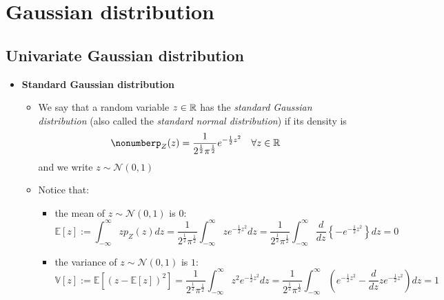 \documentclass[12pt,a4paper]{article}
\begin{document}
\section{Gaussian distribution}

\subsection{Univariate Gaussian distribution}

\begin{itemize}

\item \textbf{Standard Gaussian distribution}

  \begin{itemize}

  \item We say that a random variable $z\in \mathbb{R}$ has
    the \emph{standard Gaussian distribution} (also called the \emph{standard normal distribution}) if
    its density is
    \begin{equation}\nonumber%
      p_{Z}(z)
      = \frac{1}{2^{\frac{1}{2}}\pi^{\frac{1}{2}}}e^{- \frac{1}{2}z^{2}}
      \quad \forall z\in \R
    \end{equation}
    and we write $z\sim \mathcal{N}(0,1)$

  \item Notice that:
    \begin{itemize}
    \item the mean of $z\sim \mathcal{N}(0,1)$ is $0$:
      \begin{equation}\nonumber%
        \mathbb{E}\left[z\right]
        := \int_{-\infty}^{\infty}zp_{Z}(z)dz
        = \frac{1}{2^{\frac{1}{2}}\pi^{\frac{1}{2}}}\int_{-\infty}^{\infty}ze^{- \frac{1}{2}z^{2}}dz
        = \frac{1}{2^{\frac{1}{2}}\pi^{\frac{1}{2}}}\int_{-\infty}^{\infty}\frac{d}{dz}\left\{-e^{- \frac{1}{2}z^{2}}\right\}dz
        = 0
      \end{equation}
    \item the variance of $z\sim \mathcal{N}(0,1)$ is $1$:
      \begin{equation}\nonumber%
        \mathbb{V}\left[z\right]
        := \mathbb{E}\left[ (z-\mathbb{E}[z])^{2} \right]
        = \frac{1}{2^{\frac{1}{2}}\pi^{\frac{1}{2}}}\int_{-\infty}^{\infty}z^{2}e^{- \frac{1}{2}z^{2}}dz
        = \frac{1}{2^{\frac{1}{2}}\pi^{\frac{1}{2}}}\int_{-\infty}^{\infty}
        \left(e^{- \frac{1}{2}z^{2}} - \frac{d}{dz}ze^{- \frac{1}{2}z^{2}}\right)
        dz = 1
      \end{equation}
    \end{itemize}


\end{itemize}
\end{itemize}
\end{document}
